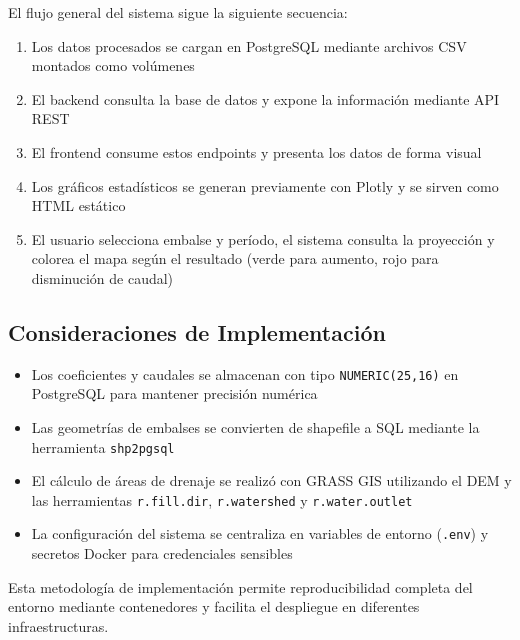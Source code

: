 El flujo general del sistema sigue la siguiente secuencia:

\begin{enumerate}
    \item Los datos procesados se cargan en PostgreSQL mediante archivos CSV montados como volúmenes
    \item El backend consulta la base de datos y expone la información mediante API REST
    \item El frontend consume estos endpoints y presenta los datos de forma visual
    \item Los gráficos estadísticos se generan previamente con Plotly y se sirven como HTML estático
    \item El usuario selecciona embalse y período, el sistema consulta la proyección y colorea el mapa según el resultado (verde para aumento, rojo para disminución de caudal)
\end{enumerate}

\subsection{Consideraciones de Implementación}

\begin{itemize}
    \item Los coeficientes y caudales se almacenan con tipo \texttt{NUMERIC(25,16)} en PostgreSQL para mantener precisión numérica
    \item Las geometrías de embalses se convierten de shapefile a SQL mediante la herramienta \texttt{shp2pgsql}
    \item El cálculo de áreas de drenaje se realizó con GRASS GIS utilizando el DEM y las herramientas \texttt{r.fill.dir}, \texttt{r.watershed} y \texttt{r.water.outlet}
    \item La configuración del sistema se centraliza en variables de entorno (\texttt{.env}) y secretos Docker para credenciales sensibles
\end{itemize}

Esta metodología de implementación permite reproducibilidad completa del entorno mediante contenedores y facilita el despliegue en diferentes infraestructuras.
